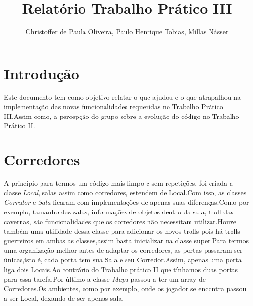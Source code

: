 \documentclass[runningheads,a4paper]{llncs}
\begin{document}
\mainmatter 

\title{Relatório Trabalho Prático III}


\author{Christoffer de Paula Oliveira, Paulo Henrique Tobias, Millas Násser}



\tocauthor{{}}

\maketitle

\medskip

\begingroup
\let\clearpage\relax
\tableofcontents
{}
\endgroup

\medskip
\medskip


\section*{Introdução}
    Este documento tem como objetivo relatar o que ajudou e o que atrapalhou na implementação das novas funcionalidades requeridas no Trabalho Prático III.Assim como, a percepção do grupo sobre a evolução do código no Trabalho Prático II.

\section{Corredores}
    A princípio para termos um código mais limpo e sem repetições, foi criada a classe \emph{Local}, salas assim como corredores, estendem de Local.Com isso, as classes \emph{Corredor} e \emph{Sala} ficaram com implementações de apenas suas diferenças.Como por exemplo, tamanho das salas, informações de objetos dentro da sala, troll das cavernas, são funcionalidades que os corredores não necessitam utilizar.Houve também uma utilidade dessa classe para adicionar os novos trolls pois há trolls guerreiros em ambas as classes,assim basta inicializar na classe super.Para termos uma organização melhor antes de adaptar os corredores, as portas passaram ser únicas,isto é, cada porta tem sua Sala e seu Corredor.Assim, apenas uma porta liga dois Locais.Ao contrário do Trabalho prático II que tínhamos duas portas para essa tarefa.Por último a classe \emph{Mapa} passou a ter um array de Corredores.Os ambientes, como por exemplo, onde os jogador se encontra passou a ser Local, dexando de ser apenas sala.
\end{document}
